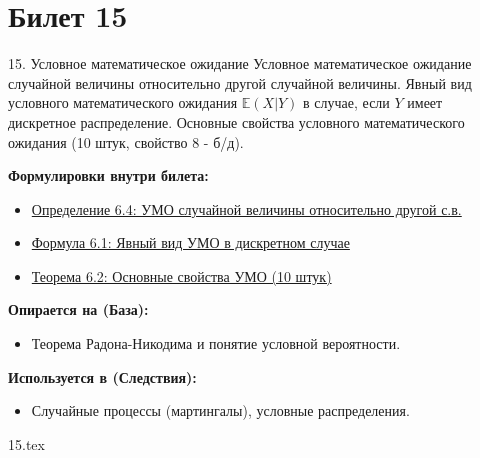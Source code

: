 \documentclass[a4paper, 12pt]{article}
\newcommand{\ticketsection}[1]{\vspace{0.5em}\noindent\textbf{\textcolor{ticketdark}{\sffamily #1}}\par}
\newcommand{\E}{\mathbb{E}}        %
\begin{document}
\section{Билет 15}
\begin{ticketskeleton}{15. Условное математическое ожидание}
     Условное математическое ожидание случайной величины относительно другой случайной величины. Явный вид условного математического ожидания $\E(X|Y)$ в случае, если $Y$ имеет дискретное распределение. Основные свойства условного математического ожидания (10 штук, свойство 8 - б/д).

    \ticketsection{Формулировки внутри билета:}
    \begin{itemize}
        \item \hyperref[def:cme_rv]{Определение 6.4: УМО случайной величины относительно другой с.в.}
        \item \hyperref[eq:cme_discrete]{Формула 6.1: Явный вид УМО в дискретном случае}
        \item \hyperref[thm:cme_props]{Теорема 6.2: Основные свойства УМО (10 штук)}

    \end{itemize}

    \ticketsection{Опирается на (База):}
    \begin{itemize}
        \item Теорема Радона-Никодима и понятие условной вероятности.
    \end{itemize}

    \ticketsection{Используется в (Следствия):}
    \begin{itemize}
        \item Случайные процессы (мартингалы), условные распределения.
    \end{itemize}
\end{ticketskeleton}

{15.tex}
\end{document}
